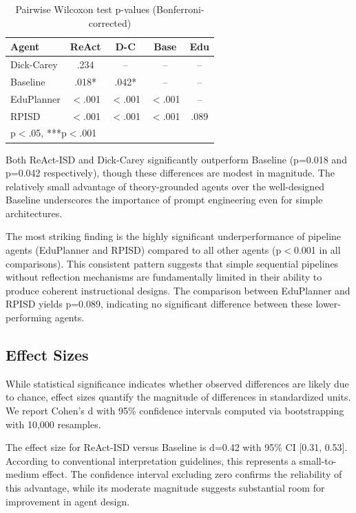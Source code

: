 \begin{table}[ht!]
\centering
\small
\caption{Pairwise Wilcoxon test p-values (Bonferroni-corrected)}
\label{tab:significance}
\begin{tabular}{lcccc}
\toprule
\textbf{Agent} & \textbf{ReAct} & \textbf{D-C} & \textbf{Base} & \textbf{Edu} \\
\midrule
Dick-Carey & .234 & -- & -- & -- \\
Baseline & .018* & .042* & -- & -- \\
EduPlanner & $<$.001 & $<$.001 & $<$.001 & -- \\
RPISD & $<$.001 & $<$.001 & $<$.001 & .089 \\
\bottomrule
\multicolumn{5}{l}{\small *p$<$.05, ***p$<$.001}
\end{tabular}
\end{table}

Both ReAct-ISD and Dick-Carey significantly outperform Baseline (p=0.018 and p=0.042 respectively), though these differences are modest in magnitude. The relatively small advantage of theory-grounded agents over the well-designed Baseline underscores the importance of prompt engineering even for simple architectures.

The most striking finding is the highly significant underperformance of pipeline agents (EduPlanner and RPISD) compared to all other agents (p$<$0.001 in all comparisons). This consistent pattern suggests that simple sequential pipelines without reflection mechanisms are fundamentally limited in their ability to produce coherent instructional designs. The comparison between EduPlanner and RPISD yields p=0.089, indicating no significant difference between these lower-performing agents.

\subsection{Effect Sizes}

While statistical significance indicates whether observed differences are likely due to chance, effect sizes quantify the magnitude of differences in standardized units. We report Cohen's d with 95\% confidence intervals computed via bootstrapping with 10,000 resamples.

The effect size for ReAct-ISD versus Baseline is d=0.42 with 95\% CI [0.31, 0.53]. According to conventional interpretation guidelines, this represents a small-to-medium effect. The confidence interval excluding zero confirms the reliability of this advantage, while its moderate magnitude suggests substantial room for improvement in agent design.

